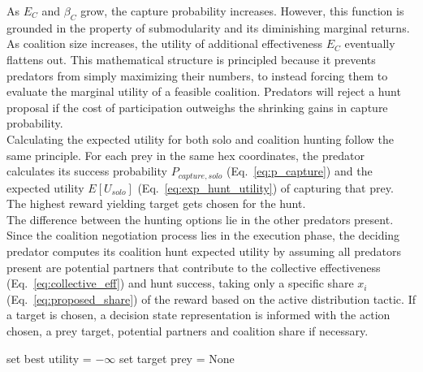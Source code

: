 \documentclass[12pt,a4paper]{report}
\begin{document}
	\vspace{1em}
	
	As $E_{C}$ and $β_{C}$ grow, the capture probability increases. However, this function is grounded in the property of submodularity \cite{Bach2013} and its diminishing marginal returns. As coalition size increases, the utility of additional effectiveness $E_{C}$ eventually flattens out. This mathematical structure is principled because it prevents predators from simply maximizing their numbers, to instead forcing them to evaluate the marginal utility of a feasible coalition. Predators will reject a hunt proposal if the cost of participation outweighs the shrinking gains in capture probability. \\
	
	Calculating the expected utility for both solo and coalition hunting follow the same principle. For each prey in the same hex coordinates, the predator calculates its success probability $P_{capture,solo}$ (Eq.~\ref{eq:p_capture}) and the expected utility $E[U_{solo}]$ (Eq.~\ref{eq:exp_hunt_utility}) of capturing that prey. The highest reward yielding target gets chosen for the hunt. \\
	
	The difference between the hunting options lie in the other predators present. Since the coalition negotiation process lies in the execution phase, the deciding predator computes its coalition hunt expected utility by assuming all predators present are potential partners that contribute to the collective effectiveness (Eq.~\ref{eq:collective_eff}) and hunt success, taking only a specific share $x_i$ (Eq.~\ref{eq:proposed_share})  of the reward based on the active distribution tactic. If a target is chosen, a decision state representation is informed with the action chosen, a prey target, potential partners and coalition share if necessary. \\
	
	\begin{algorithm}[H]
		
		\caption{Expected Utility Calculation for Solo Hunt Action}
		\label{alg:Action_SOLO_HUNT_utility}
		
		
		
		\BlankLine
		
		set best utility = $-\infty$\;
		set target prey = None\;
		
	\end{algorithm}
	
\end{document}
